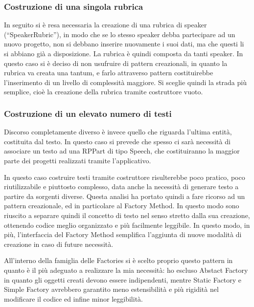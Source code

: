 \documentclass[a4paper,12pt]{report}
\begin{document}
\subsubsection{Costruzione di una singola rubrica}
In seguito si è resa necessaria la creazione di una rubrica di speaker (“SpeakerRubric”), in modo che se lo stesso speaker debba partecipare ad un nuovo progetto, non si debbano inserire nuovamente i suoi dati, ma che questi li si abbiano già a disposizione. La rubrica è quindi composta da tanti speaker. In questo caso si è deciso di non usufruire di pattern creazionali, in quanto la rubrica va creata una tantum, e farlo attraverso pattern costituirebbe l’inserimento di un livello di complessità maggiore. Si sceglie quindi la strada più semplice, cioè la creazione della rubrica tramite costruttore vuoto.

\subsubsection{Costruzione di un elevato numero di testi}
Discorso completamente diverso è invece quello che riguarda l’ultima entità, costituita dal testo. In questo caso si prevede che spesso ci sarà necessità di associare un testo ad una RPPart di tipo Speech, che costituiranno la maggior parte dei progetti realizzati tramite l’applicativo. 

In questo caso costruire testi tramite costruttore risulterebbe poco pratico, poco riutilizzabile e piuttosto complesso, data anche la necessità di generare testo a partire da sorgenti diverse. Questa analisi ha portato quindi a fare ricorso ad un pattern creazionale, ed in particolare al Factory Method. In questo modo sono riuscito a separare quindi il concetto di testo nel senso stretto dalla sua creazione, ottenendo codice meglio organizzato e più facilmente leggibile. In questo modo, in più, l’interfaccia del Factory Method semplifica l’aggiunta di nuove modalità di creazione in caso di future necessità. 

All’interno della famiglia delle Factories si è scelto proprio questo pattern in quanto è il più adeguato a realizzare la mia necessità: ho escluso Abstact Factory in quanto gli oggetti creati devono essere indipendenti, mentre Static Factory e Simple Factory avrebbero garantito meno estensibilità e più rigidità nel modificare il codice ed infine minor leggibilità.
\end{document}
